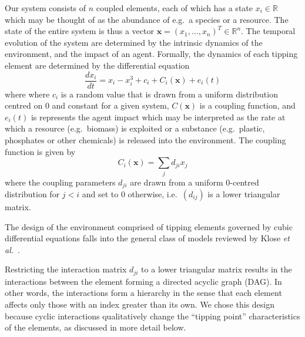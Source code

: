 \documentclass[conference]{IEEEtran}
\newcommand{\vectorsym}[1]{\ensuremath{\mathbf{#1}}}
\newcommand{\agentimpact}{\ensuremath{e}}
\begin{document}
Our system consists of $n$ coupled elements, each of which has a state
$x_i \in \mathbb{R}$ which may be thought of as the abundance of e.g.\
a species or a resource. The state of the entire system is thus a
vector $\vectorsym{x} = (x_1, \ldots, x_n)^T \in \mathbb{R}^n$. The
temporal evolution of the system are determined by the intrinsic
dynamics of the environment, and the impact of an agent. Formally, the
dynamics of each tipping element are determined by the differential
equation
\begin{equation}
  \label{eq_coupledwithagent}
  \frac{dx_i}{dt} = x_i - x_i^3 + c_i + C_i(\vectorsym{x}) + \agentimpact_i(t)
\end{equation}
where where $c_i$ is a random value that is drawn from a uniform
distribution centred on $0$ and constant for a given system,
$C(\vectorsym{x})$ is a coupling function, and $\agentimpact_i(t)$ is
represents the agent impact which may be interpreted as the rate at
which a resource (e.g.\ biomass) is exploited or a substance (e.g.\
plastic, phosphates or other chemicals) is released into the
environment. The coupling function is given by
\begin{equation}
  \label{eq_couplingfunction}
  C_i(\vectorsym{x}) = \sum_j d_{ji} x_j
\end{equation}
where the coupling parameters $d_{ji}$ are drawn from a uniform
$0$-centred distribution for $j < i$ and set to $0$ otherwise, i.e.\
$(d_{ij})$ is a lower triangular matrix.

The design of the environment comprised of tipping elements governed
by cubic differential equations falls into the general class of models
reviewed by Klose \textit{et al.}\
\cite{Klose2019_interactingtippingelements}.

Restricting the interaction matrix $d_{ji}$ to a lower triangular
matrix results in the interactions between the element forming a
directed acyclic graph (DAG). In other words, the interactions form a
hierarchy in the sense that each element affects only those with an
index greater than its own. We chose this design because cyclic
interactions qualitatively change the ``tipping point''
characteristics of the elements, as discussed in more detail below.


\end{document}
